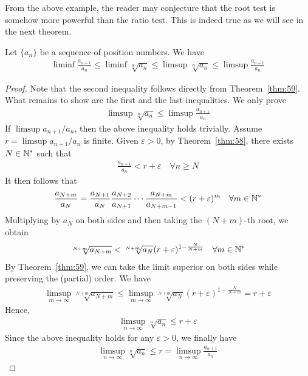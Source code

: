\documentclass[thmcnt=section, 12pt]{my-elegantbook}
\begin{document}
From the above example, the reader may conjecture that the root test is somehow more powerful than the ratio test. This is indeed true as we will see in the next theorem.

\begin{theorem}
    Let $\{a_n\}$ be a sequence of position numbers. We have
    \begin{align*}
        \liminf \frac{a_{n+1}}{a_n}
        \leq \liminf \sqrt[n]{a_n}
        \leq \limsup \sqrt[n]{a_n}
        \leq \limsup \frac{a_{n+1}}{a_n}
    \end{align*}
\end{theorem}

\begin{proof}
    Note that the second inequality follows directly from Theorem~\ref{thm:59}. What remains to show are the first and the last inequalities. We only prove
    \begin{align*}
        \limsup \sqrt[n]{a_n}
        \leq \limsup \frac{a_{n+1}}{a_n}
    \end{align*}
    If $\limsup a_{n+1} / {a_n}$, then the above inequality holds trivially. Assume $r = \limsup a_{n+1} / {a_n}$ is finite. Given $\varepsilon > 0$, by Theorem~\ref{thm:58}, there exists $N \in \mathbb{N}^\ast$ such that
    \begin{align*}
        \frac{a_{n+1}}{a_n} < r + \varepsilon
        \quad \forall n \geq N
    \end{align*}
    It then follows that
    \begin{align*}
        \frac{a_{N+m}}{a_N}
        = \frac{a_{N+1}}{a_{N}}
        \frac{a_{N+2}}{a_{N+1}}
        \cdots \frac{a_{N+m}}{a_{N+m-1}}
        < (r + \varepsilon)^m
        \quad \forall m \in \mathbb{N}^\ast
    \end{align*}
    Multiplying by $a_N$ on both sides and then taking the $(N+m)$-th root, we obtain
    \begin{align*}
        \sqrt[N+m]{a_{N+m}}
        < \sqrt[N+m]{a_{N}} (r+\varepsilon)^{1 - \frac{N}{N + m}}
        \quad \forall m \in \mathbb{N}^\ast
    \end{align*}
    By Theorem~\ref{thm:59}, we can take the limit superior on both sides while preserving the (partial) order. We have
    \begin{align*}
        \limsup_{m \to \infty} \sqrt[N+m]{a_{N+m}}
        \leq \limsup_{m \to \infty} \sqrt[N+m]{a_{N}} (r+\varepsilon)^{1 - \frac{N}{N + m}}
        = r + \varepsilon
    \end{align*}
    Hence,
    \begin{align*}
        \limsup_{n \to \infty} \sqrt[n]{a_{n}}
        \leq r + \varepsilon
    \end{align*}
    Since the above inequality holds for any $\varepsilon > 0$, we finally have
    \begin{align*}
        \limsup_{n \to \infty} \sqrt[n]{a_{n}}
        \leq r
        = \limsup_{n \to \infty} \frac{a_{n+1}}{a_n}
    \end{align*}
\end{proof}
\end{document}
